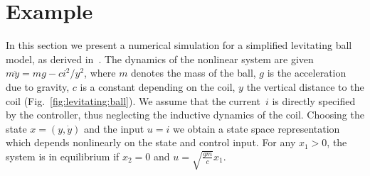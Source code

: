\section{Example}\label{sec:example}
In this section we present a numerical simulation for a simplified levitating ball model, as derived in~\cite{Schaich:2015}. The dynamics of the nonlinear system are given $m\ddot y = m g - c i^2/y^2$,
where $m$ denotes the mass of the ball, $g$ is the acceleration due to gravity, $c$ is a constant depending
on the coil, $y$ the vertical distance to the coil (Fig.~\ref{fig:levitating:ball}). We assume that the current~$i$ is directly specified by the controller, thus neglecting the inductive dynamics of the coil. %
Choosing the state $x=(y,\dot y)$ and the input $u=i$ we obtain a state space representation which depends nonlinearly
on the state and control input. For any $x_1>0$, the system is in equilibrium if $x_2=0$ and $u=\sqrt{\frac{gm}{c}}x_1$.

